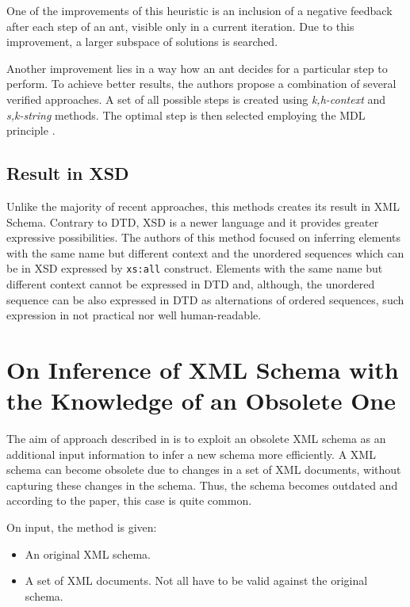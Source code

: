 One of the improvements of this heuristic is an inclusion of a negative feedback after each step of an ant, visible only in a current iteration. Due to this improvement, a larger subspace of solutions is searched.

Another improvement lies in a way how an ant decides for a particular step to perform. To achieve better results, the authors propose a combination of several verified approaches. A set of all possible steps is created using \emph{k,h-context} \cite{Ahonen1996GeneratingGrammars} and \emph{s,k-string} \cite{Raman97thesk-strings, Wong03onstructural} methods. The optimal step is then selected employing the MDL principle \cite{Grünwald05atutorial, Garofalakis:2000:XSE:342009.335409}.

\subsection{Result in XSD}
Unlike the majority of recent approaches, this methods creates its result in XML Schema. Contrary to DTD, XSD is a newer language and it provides greater expressive possibilities. The authors of this method focused on inferring elements with the same name but different context and the unordered sequences which can be in XSD expressed by \texttt{xs:all} construct. Elements with the same name but different context cannot be expressed in DTD and, although, the unordered sequence can be also expressed in DTD as alternations of ordered sequences, such expression in not practical nor well human-readable.

\section{On Inference of XML Schema with the Knowledge of an Obsolete One}
The aim of approach described in \cite{Mlynkova:2009:IXS:1862681.1862693} is to exploit an obsolete XML schema as an additional input information to infer a new schema more efficiently. A XML schema can become obsolete due to changes in a set of XML documents, without capturing these changes in the schema. Thus, the schema becomes outdated and according to the paper, this case is quite common.

On input, the method is given:
\begin{itemize}
\item An original XML schema.
\item A set of XML documents. Not all have to be valid against the original schema.
\end{itemize}

